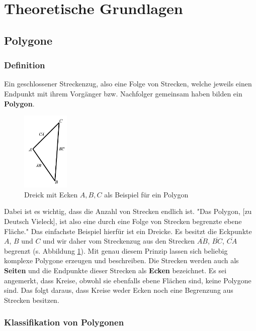 \section{Theoretische Grundlagen}

\subsection{Polygone}
\subsubsection{Definition}

Ein geschlossener  Streckenzug, also eine Folge von Strecken, welche jeweils einen Endpunkt mit ihrem Vorgänger bzw. Nachfolger gemeinsam haben bilden ein \textbf{Polygon}.

\begin{figure}
  \centering
  \includegraphics[width=0.2\textwidth]{bilder/dreieck_abc.png}
  \caption[Ein Dreieck als Beispiel für ein Polygon]{\centering Dreick mit Ecken $A, B, C$ als Beispiel für ein Polygon}
  \label{fig:triangle}
\end{figure}

Dabei ist es wichtig, dass die Anzahl von Strecken endlich ist. "Das Polygon, [zu Deutsch Vieleck], ist also eine durch eine Folge von Strecken begrenzte ebene Fläche." \cite{polydef}
Das einfachste Beispiel hierfür ist ein Dreicke. Es besitzt die Eckpunkte $A$, $B$ und $C$ und wir daher vom Streckenzug aus den Strecken $\overline{AB}$, $\overline{BC}$, $\overline{CA}$ begrenzt (s. Abbildung \ref{fig:triangle}).
Mit genau diesem Prinzip lassen sich beliebig komplexe Polygone erzeugen und beschreiben. Die Strecken werden auch als \textbf{Seiten} und die Endpunkte dieser Strecken 
als \textbf{Ecken} bezeichnet. 
Es sei angemerkt, dass Kreise, obwohl sie ebenfalls ebene Flächen sind, keine Polygone sind. Das folgt daraus, dass Kreise weder Ecken noch eine Begrenzung aus Strecken besitzen.

\subsubsection{Klassifikation von Polygonen}

